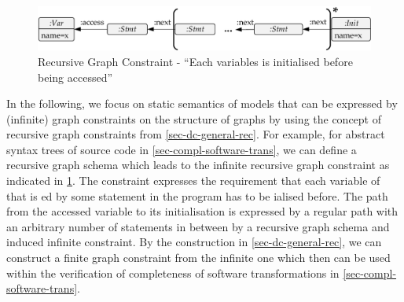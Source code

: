 \begin{figure}[!tb]
\begin{center}
\includegraphics[width=.9\textwidth]{img/semantics/static.pdf}
\end{center}
\caption{Recursive Graph Constraint - ``Each variables is initialised before being accessed''}
\label{fig:sec-compl-static-sem:constraint}
\end{figure}

In the following, we focus on static semantics of models that can be expressed by (infinite) graph constraints on the structure of graphs by using the concept of recursive graph constraints from \cref{sec-dc-general-rec}.
For example, for abstract syntax trees of source code in \cref{sec-compl-software-trans}, we can define a recursive graph schema which leads to the infinite recursive graph constraint as indicated in \cref{fig:sec-compl-static-sem:constraint}.
The constraint expresses the requirement that each variable  of   that is ed by some statement  in the program has to be ialised before.
The path from the accessed variable to its initialisation is expressed by a regular path with an arbitrary number of statements in between by a recursive graph schema and induced infinite constraint.
By the construction in \cref{sec-dc-general-rec}, we can construct a finite graph constraint from the infinite one which then can be used within the verification of completeness of software transformations in \cref{sec-compl-software-trans}.